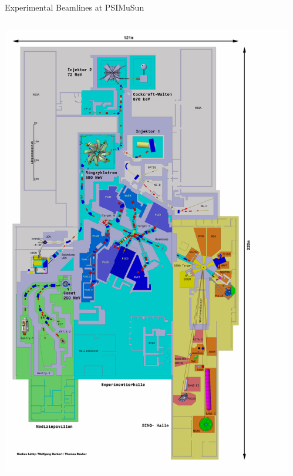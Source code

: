 \documentclass{beamer}
\begin{document}
\begin{frame}{Experimental Beamlines at PSI}{MuSun}
 \begin{columns}[onlytextwidth]
  \begin{column}{0.4\textwidth}
  \includegraphics[height=0.8\textheight]{figures/HallenplanPSI.png} \\
  \end{column}
  \begin{column}{0.25\textwidth}

\end{column}
\end{columns}
\end{frame}
\end{document}
